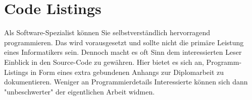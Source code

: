 
\chapter{Code Listings}



Als Software-Spezialist können Sie selbstverständlich hervorragend
programmieren. Das wird vorausgesetzt und sollte nicht die primäre Leistung
eines Informatikers sein. Dennoch macht es oft Sinn dem interessierten Leser
Einblick in den Source-Code zu gewähren. Hier bietet es sich an,
Programm-Listings in Form eines extra gebundenen Anhangs zur Diplomarbeit zu
dokumentieren. Weniger an Programmierdetails Interessierte können sich dann
"unbeschwerter" der eigentlichen Arbeit widmen.
